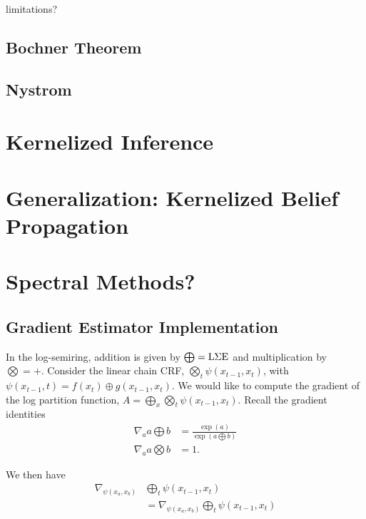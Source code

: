 \documentclass{article}
\begin{document}
limitations?
\subsection{Bochner Theorem}
\subsection{Nystrom}

\section{Kernelized Inference}

\section{Generalization: Kernelized Belief Propagation}

\section{Spectral Methods?}




\begin{appendix}
\section{Gradient Estimator Implementation}
In the log-semiring, addition is given by $\bigoplus = \LSE$ and multiplication
by $\bigotimes = +$.
Consider the linear chain CRF, $\bigotimes_t \psi(x_{t-1}, x_t)$,
with $\psi(x_{t-1}, t) = f(x_t) \oplus g(x_{t-1},x_t)$.
We would like to compute the gradient of the
log partition function, $A = \bigoplus_x \bigotimes_t \psi(x_{t-1}, x_t)$.
Recall the gradient identities 
\begin{equation}
\begin{aligned}
\nabla_a a \bigoplus b &= \frac{\exp(a)}{\exp(a \bigoplus b)}\\
\nabla_a a \bigotimes b &= 1.
\end{aligned}
\end{equation}

We then have 
\begin{equation}
\begin{aligned}
\nabla_{\psi(x_a,x_b)} &\bigoplus_t \psi(x_{t-1}, x_t)\\
&= \nabla_{\psi(x_a,x_b)} \bigoplus_t \psi(x_{t-1}, x_t)\\
\end{aligned}
\end{equation}


\end{appendix}
\end{document}

